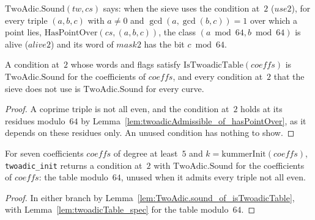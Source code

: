\begin{definition}\label{def:TwoAdic.Sound}
  \leanok
  $\mathrm{TwoAdic.Sound}(\mathit{tw}, \mathit{cs})$ says: when the sieve uses the condition at~$2$
  ($\mathit{use2}$), for every triple $(a, b, c)$ with $a \ne 0$ and $\gcd(a, \gcd(b, c)) = 1$ over
  which a point lies, $\mathrm{HasPointOver}(\mathit{cs}, (a, b, c))$, the class
  $(a \bmod 64, b \bmod 64)$ is alive ($\mathit{alive2}$) and its word of $\mathit{mask2}$ has the
  bit $c \bmod 64$.
\end{definition}

\begin{lemma}\label{lem:TwoAdic.sound_of_isTwoadicTable}
  \leanok
  A condition at~$2$ whose words and flags satisfy $\mathrm{IsTwoadicTable}(\mathit{coeffs})$ is
  $\mathrm{TwoAdic.Sound}$ for the coefficients of $\mathit{coeffs}$, and every condition at~$2$
  that the sieve does not use is $\mathrm{TwoAdic.Sound}$ for every curve.
\end{lemma}

\begin{proof}
  \leanok
  A coprime triple is not all even, and the condition at~$2$ holds at its residues modulo~$64$ by
  Lemma~\ref{lem:twoadicAdmissible_of_hasPointOver}, as it depends on these residues only. An unused
  condition has nothing to show.
\end{proof}

\begin{lemma}\label{lem:twoadicInit_spec}
  \leanok
  For seven coefficients $\mathit{coeffs}$ of degree at least~$5$ and
  $k = \mathrm{kummerInit}(\mathit{coeffs})$, \texttt{twoadic\_init} returns a condition at~$2$ with
  $\mathrm{TwoAdic.Sound}$ for the coefficients of $\mathit{coeffs}$: the table modulo~$64$, unused
  when it admits every triple not all even.
\end{lemma}

\begin{proof}
  \leanok
  In either branch by Lemma~\ref{lem:TwoAdic.sound_of_isTwoadicTable}, with
  Lemma~\ref{lem:twoadicTable_spec} for the table modulo~$64$.
\end{proof}

